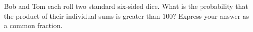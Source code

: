 Bob and Tom each roll two standard six-sided dice. What is the probability that the product of their individual sums is greater than $100$? Express your answer as a common fraction.
